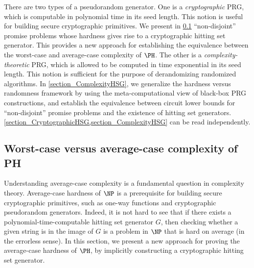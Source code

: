 \documentclass{toc}
\begin{document}
%
%
%
%
%
%
%
%
%


There are two types of a pseudorandom generator.
One is a \emph{cryptographic} PRG, which is computable in polynomial time in its seed length.
This notion is useful for building secure cryptographic primitives.
We present
in \cref{section_CryptographicHSG}
``non-disjoint'' promise problems
whose hardness gives rise to a cryptographic hitting set generator.
This provides
a new approach for establishing the equivalence between the worst-case and average-case complexity of $\PH$.
The other is a \emph{complexity-theoretic} PRG, which is allowed to be computed in time exponential in its seed length.
This notion is sufficient for the purpose of derandomizing randomized algorithms.
In \cref{section_ComplexityHSG},
we generalize the hardness versus randomness framework by
using the meta-computational view of black-box PRG constructions,
and establish the equivalence between
circuit lower bounds for ``non-disjoint'' promise problems
and
the existence of hitting set generators.
\cref{section_CryptographicHSG,section_ComplexityHSG} can be read independently.

%
%
%
%
%
%
%
%
%
%

%
%
%
%
%
%
%
%
%
%

%
%

%
%
%
%
%
%
%
%




\subsection{Worst-case versus average-case complexity of PH}
\label{section_CryptographicHSG}

Understanding average-case complexity is a fundamental question
in complexity theory.
Average-case hardness of $\NP$ is a prerequisite for building secure cryptographic primitives,
such as one-way functions and cryptographic pseudorandom generators.
Indeed, it is not hard to see that if there exists a polynomial-time-computable hitting set generator $G$,
then checking whether a given string is in the image of $G$ is
a problem in $\NP$ that is hard on average (in the errorless sense).
In this section, we present a new approach for
proving the average-case hardness of $\PH$,
by implicitly
constructing a cryptographic hitting set generator.
\end{document}
